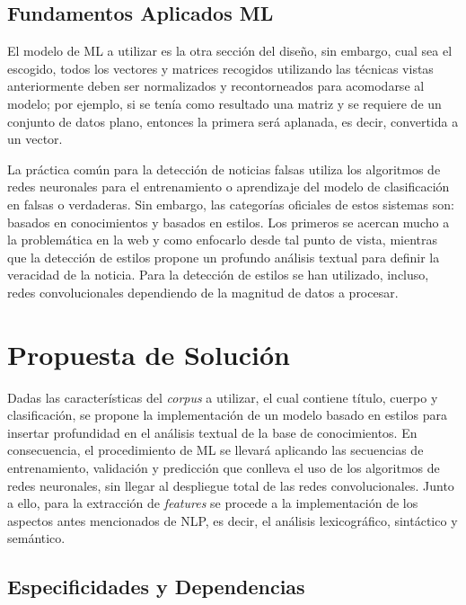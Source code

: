 \documentclass{llncs}
\begin{document}
\begin{multicols}{2}[]
\subsection{Fundamentos Aplicados ML}

El modelo de ML a utilizar es la otra secci\'on del dise\~no, sin embargo, cual sea el escogido, todos los vectores y matrices recogidos utilizando las t\'ecnicas vistas anteriormente deben
ser normalizados y recontorneados para acomodarse al modelo; por ejemplo, si se ten\'ia como resultado una matriz y se requiere de un conjunto de datos plano, entonces la primera ser\'a
aplanada, es decir, convertida a un vector.

La pr\'actica com\'un para la detecci\'on de noticias falsas utiliza los algoritmos de redes neuronales para el entrenamiento o aprendizaje del modelo de clasificaci\'on en falsas o verdaderas.
Sin embargo, las categor\'ias oficiales de estos sistemas son: basados en conocimientos y basados en estilos. Los primeros se acercan mucho a la problem\'atica en la web y como enfocarlo
desde tal punto de vista, mientras que la detecci\'on de estilos propone un profundo an\'alisis textual para definir la veracidad de la noticia. Para la detecci\'on de estilos se han utilizado,
incluso, redes convolucionales dependiendo de la magnitud de datos a procesar.

\section{Propuesta de Soluci\'on}

Dadas las caracter\'isticas del \textit{corpus} a utilizar, el cual contiene t\'itulo, cuerpo y clasificaci\'on, se propone la implementaci\'on de un modelo basado en estilos para insertar
profundidad en el an\'alisis textual de la base de conocimientos. En consecuencia, el procedimiento de ML se llevar\'a aplicando las secuencias de entrenamiento, validaci\'on y predicci\'on
que conlleva el uso de los algoritmos de redes neuronales, sin llegar al despliegue total de las redes convolucionales. Junto a ello, para la extracci\'on de \textit{features} se procede
a la implementaci\'on de los aspectos antes mencionados de NLP, es decir, el an\'alisis lexicogr\'afico, sint\'actico y sem\'antico.

\subsection{Especificidades y Dependencias}


\end{multicols}
\end{document}
